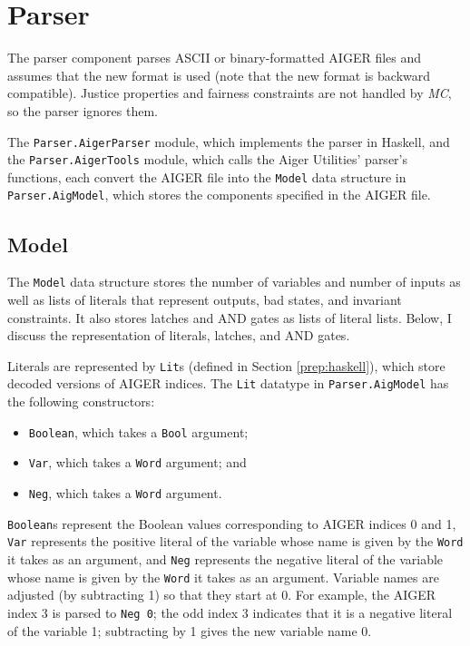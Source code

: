 \documentclass[12pt,a4paper,twoside,openright]{report}
\begin{document}
{{\section{Parser}
\label{impl:aiger}

The parser component parses ASCII or binary-formatted AIGER files and
assumes that the new format is used
(note that the new format is backward compatible).
Justice properties and fairness constraints are not handled by \emph{MC}, so
the parser ignores them.

The \verb,Parser.AigerParser, module, which implements the parser in Haskell, and
the \verb,Parser.AigerTools, module, which calls the Aiger Utilities' parser's functions,
each convert the AIGER file into the \verb,Model, data structure in \verb,Parser.AigModel,,
which stores the components specified in the AIGER file.

\subsection{Model}

The \verb,Model, data structure stores the number of variables and
number of inputs as well as lists of literals that represent outputs, bad states,
and invariant constraints. It also stores latches and AND gates as
lists of literal lists. Below, I discuss the representation of literals, latches, and
AND gates.

Literals are represented by \verb,Lit,s (defined in Section \ref{prep:haskell}),
which store decoded versions of AIGER indices. The {\tt Lit} datatype
in {\tt Parser.AigModel} has the following constructors:
\begin{itemize}
\item \verb,Boolean,, which takes a \verb,Bool, argument;
\item \verb,Var,, which takes a \verb,Word, argument; and
\item \verb,Neg,, which takes a \verb,Word, argument.
\end{itemize}
\verb,Boolean,s represent the Boolean values corresponding to AIGER indices 0 and 1,
\verb,Var, represents the positive literal of the variable whose name is given by the
\verb,Word, it takes as an argument, and \verb,Neg, represents the negative literal
of the variable whose name is given by the \verb,Word, it takes as an argument.
Variable names are adjusted (by subtracting 1) so that they start at 0.
For example, the AIGER index 3 is parsed to \verb,Neg 0,;
the odd index 3 indicates that it is a negative literal of the variable 1;
subtracting by 1 gives the new variable name 0.

}}
\end{document}
